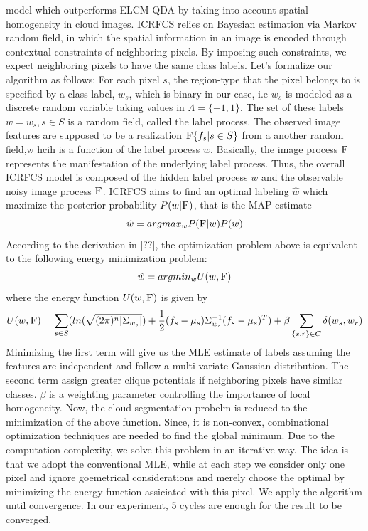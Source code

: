 \documentclass[english]{article}\usepackage{graphicx, color}
\numberwithin{equation}{section}
\numberwithin{figure}{section}
\begin{document}
model which outperforms ELCM-QDA by taking into account spatial homogeneity
in cloud images. ICRFCS relies on Bayesian estimation via Markov random field, 
in which the spatial information in an image is encoded through contextual 
constraints of neighboring pixels. By imposing such constraints, we expect 
neighboring pixels to have the same class labels. Let's formalize our algorithm 
as follows: For each pixel $s$, the region-type that the pixel belongs to is 
specified by a class label, $w_s$, which is binary in our case, i.e $w_s$ is 
modeled as a discrete random variable taking values in $\Lambda=\{-1,1\}$. 
The set of these labels $w={w_s, s\in S}$ is a random field, called the label 
process. The observed image features are supposed to be a realization 
$\textsc{F}\{f_s|s\in S\}$ from a another random field,w hcih is a function of 
the label process $w$. Basically, the image process $\textsc{F}$ represents 
the manifestation of the underlying label process. Thus, the overall ICRFCS 
model is composed of the hidden label process $w$ and the observable noisy 
image process $\textsc{F}$. ICRFCS aims to find an optimal labeling $\hat{w}$ 
which maximize the posterior probability $P(w|\textsc{F})$, that is the MAP estimate
\begin{equation}
\hat{w}= arg max_{w} P(\textsc{F}|w) P(w)
\end{equation}
According to the derivation in [??], the optimization problem above is 
equivalent to the following energy minimization problem:
\begin{equation}
\hat{w} = arg min_w U(w, \textsc{F})
\end{equation}
where the energy function $U(w, \textsc{F})$ is given by
\begin{equation}
U(w, \textsc{F}) = \sum_{s\in S} (ln(\sqrt{(2\pi)^n|\Sigma_{w_s}|}) + \frac{1}{2}(f_s-\mu_s)\Sigma_{w_s}^{-1}(f_s-\mu_s)^T) + \beta \sum_{\{s,r\}\in C} \delta(w_s, w_r)
\end{equation}
Minimizing the first term will give us the MLE estimate of labels assuming 
the features are independent and follow a multi-variate Gaussian distribution. 
The second term assign greater clique potentials if neighboring pixels have 
similar classes. $\beta$ is a weighting parameter controlling the importance 
of local homogeneity. Now, the cloud segmentation probelm is reduced to the 
minimization of the above function. Since, it is non-convex, combinational 
optimization techniques are needed to find the global minimum. Due to the 
computation complexity, we solve this problem in an iterative way. The idea is 
that we adopt the conventional MLE, while at each step we consider only one 
pixel and ignore goemetrical considerations and merely choose the optimal by 
minimizing the energy function assiciated with this pixel. We apply the 
algorithm until convergence. In our experiment, 5 cycles are enough for the 
result to be converged.
\end{document}
